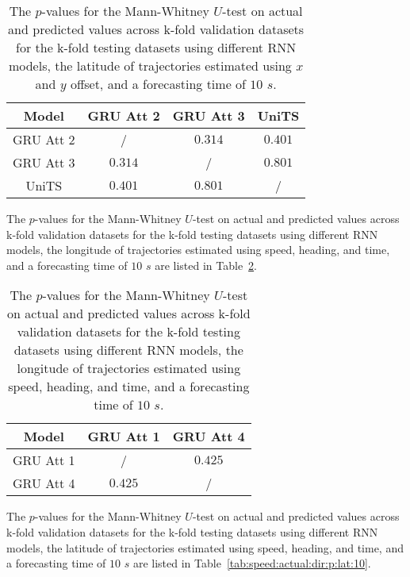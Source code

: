 \begin{table}[!ht]
	\centering
	\begin{tabular}{|c|c|c|c|}
		\hline
		Model & GRU Att 2 & GRU Att 3 & UniTS \\ \hline
		GRU Att 2 & / & $\mathbf{0.314}$ & $\mathbf{0.401}$ \\ \hline
		GRU Att 3 & $\mathbf{0.314}$ & / & $\mathbf{0.801}$ \\ \hline
		UniTS & $\mathbf{0.401}$ & $\mathbf{0.801}$ & / \\ \hline
	\end{tabular}
	\caption{The $p$-values for the Mann-Whitney $U$-test on actual and predicted values across k-fold validation datasets for the k-fold testing datasets using different RNN models, the latitude of trajectories estimated using $x$ and $y$ offset, and a forecasting time of $10$ $s$.}
	\label{tab:no:abs:p:lat:10}
\end{table}

The $p$-values for the Mann-Whitney $U$-test on actual and predicted values across k-fold validation datasets for the k-fold testing datasets using different RNN models, the longitude of trajectories estimated using speed, heading, and time, and a forecasting time of $10$ $s$ are listed in Table~\ref{tab:speed:actual:dir:p:long:10}.

\begin{table}[!ht]
	\centering
	\begin{tabular}{|c|c|c|}
		\hline
		Model & GRU Att 1 & GRU Att 4 \\ \hline
		GRU Att 1 & / & $\mathbf{0.425}$ \\ \hline
		GRU Att 4 & $\mathbf{0.425}$ & / \\ \hline
	\end{tabular}
	\caption{The $p$-values for the Mann-Whitney $U$-test on actual and predicted values across k-fold validation datasets for the k-fold testing datasets using different RNN models, the longitude of trajectories estimated using speed, heading, and time, and a forecasting time of $10$ $s$.}
	\label{tab:speed:actual:dir:p:long:10}
\end{table}

The $p$-values for the Mann-Whitney $U$-test on actual and predicted values across k-fold validation datasets for the k-fold testing datasets using different RNN models, the latitude of trajectories estimated using speed, heading, and time, and a forecasting time of $10$ $s$ are listed in Table~\ref{tab:speed:actual:dir:p:lat:10}.

